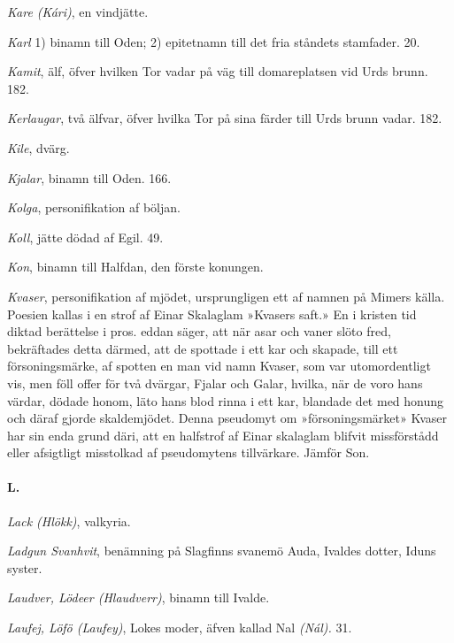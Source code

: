 \emph{Kare (Kári)}, en vindjätte.

\emph{Karl} 1) binamn till Oden; 2) epitetnamn till det fria ståndets
stamfader. 20.

\protect\hypertarget{lb1625905.xhtmlux5cux23start228}{}{}\protect\hypertarget{lb1625905.xhtmlux5cux23start228-a}{}{}\protect\hypertarget{lb1625905.xhtmlux5cux23start228-b}{}{}\protect\hypertarget{lb1625905.xhtmlux5cux23start228-c}{}{}\protect\hypertarget{lb1625905.xhtmlux5cux23start228-d}{}{}

\emph{Kamit}, älf, öfver hvilken Tor vadar på väg till domareplatsen vid
Urds brunn. 182.

\emph{Kerlaugar}, två älfvar, öfver hvilka Tor på sina färder till Urds
brunn vadar. 182.

\emph{Kile}, dvärg.

\emph{Kjalar}, binamn till Oden. 166.

\emph{Kolga}, personifikation af böljan.

\emph{Koll}, jätte dödad af Egil. 49.

\emph{Kon}, binamn till Halfdan, den förste konungen.

\emph{Kvaser}, personifikation af mjödet, ursprungligen ett af namnen på
Mimers källa. Poesien kallas i en strof af Einar Skalaglam »Kvasers
saft.» En i kristen tid diktad berättelse i pros. eddan säger, att när
asar och vaner slöto fred, bekräftades detta därmed, att de spottade i
ett kar och skapade, till ett försoningsmärke, af spotten en man vid
namn Kvaser, som var utomordentligt vis, men föll offer för två dvärgar,
Fjalar och Galar, hvilka, när de voro hans värdar, dödade honom, läto
hans blod rinna i ett kar, blandade det med honung och däraf gjorde
skaldemjödet. Denna pseudomyt om »försoningsmärket» Kvaser har sin enda
grund däri, att en halfstrof af Einar skalaglam blifvit missförstådd
eller afsigtligt misstolkad af pseudomytens tillvärkare. Jämför Son.

\paragraph{L.}

\emph{Lack (Hlökk)}, valkyria.

\emph{Ladgun Svanhvit}, benämning på Slagfinns svanemö Auda, Ivaldes
dotter, Iduns syster.

\emph{Laudver, Lödeer (Hlaudverr)}, binamn till Ivalde.

\emph{Laufej, Löfö (Laufey)}, Lokes moder, äfven kallad Nal
\emph{(Nál).} 31.

